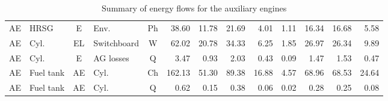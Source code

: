 \documentclass[preprint,12pt]{elsarticle}
\begin{document}
\begin{table}[hbp!]
{\begin{tabular}{clclcrrrrrrrr}
AE & HRSG & E & Env. & Ph & 38.60 & 11.78 & 21.69 & 4.01 & 1.11 & 16.34 & 16.68 & 5.58\\
AE & Cyl. & EL & Switchboard & W & 62.02 & 20.78 & 34.33 & 6.25 & 1.85 & 26.97 & 26.34 & 9.89\\
AE & Cyl. & E & AG losses & Q & 3.47 & 0.93 & 2.03 & 0.43 & 0.09 & 1.47 & 1.53 & 0.47\\
AE & Fuel tank & AE & Cyl. & Ch & 162.13 & 51.30 & 89.38 & 16.88 & 4.57 & 68.96 & 68.53 & 24.64\\
AE & Fuel tank & AE & Cyl. & Q & 0.62 & 0.15 & 0.38 & 0.06 & 0.02 & 0.28 & 0.25 & 0.08\\
\bottomrule
\end{tabular}}
\caption{Summary of energy flows for the auxiliary engines}
\label{tab:flows:en:AE}
\end{table}
\end{document}
